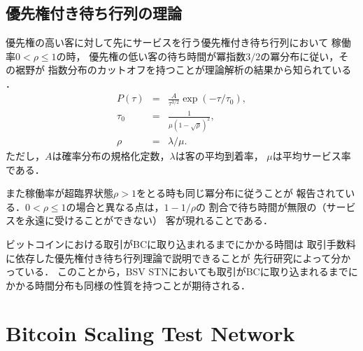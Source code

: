 \documentclass[graybox]{svmult}
\begin{document}
\subsection{優先権付き待ち行列の理論}
\label{sec:priorityqueue}

優先権の高い客に対して先にサービスを行う優先権付き待ち行列において
稼働率$0 < \rho \le 1$の時，
優先権の低い客の待ち時間が冪指数$3/2$の冪分布に従い，その裾野が
指数分布のカットオフを持つことが理論解析の結果から知られている
\cite{OB2005}．
%
\begin{eqnarray}
  P(\tau) &=& \frac{A}{\tau^{3/2}} \exp(-\tau/\tau_0), \\
  \tau_0  &=& \frac{1}{\mu (1-\sqrt{\rho})^2}, \\
  \rho    &=& \lambda / \mu.
\end{eqnarray}
%
ただし，$A$は確率分布の規格化定数，$\lambda$は客の平均到着率，
$\mu$は平均サービス率である．

また稼働率が超臨界状態$\rho > 1$をとる時も同じ冪分布に従うことが
報告されている．$0 < \rho \le 1$の場合と異なる点は，$1-1/\rho$の
割合で待ち時間が無限の（サービスを永遠に受けることができない）
客が現れることである．

ビットコインにおける取引がBCに取り込まれるまでにかかる時間は
取引手数料に依存した優先権付き待ち行列理論で説明できることが
先行研究によって分かっている\cite{KK2019}．
このことから，BSV STNにおいても取引がBCに取り込まれるまでに
かかる時間分布も同様の性質を持つことが期待される．




\section{Bitcoin Scaling Test Network}
\label{sec:stn}
\end{document}
